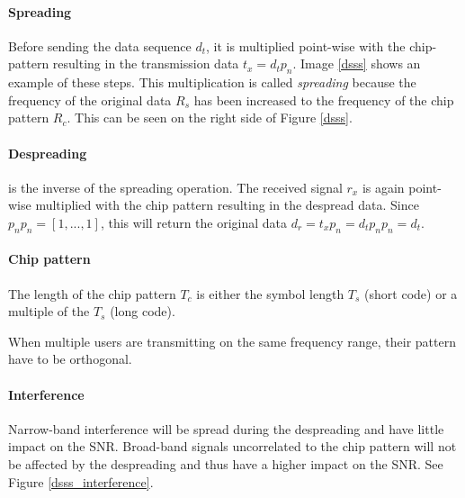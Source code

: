 		\paragraph{Spreading} Before sending the data sequence $d_t$, it is multiplied point-wise with the chip-pattern resulting in the transmission data $t_x = d_t p_n$.
		Image \ref{dsss} shows an example of these steps.
		This multiplication is called \emph{spreading} because the frequency of the original data $R_s$ has been increased to the frequency of the chip pattern $R_c$. This can be seen on the right side of Figure \ref{dsss}.
		
		\paragraph{Despreading} is the inverse of the spreading operation. The received signal $r_x$ is again point-wise multiplied with the chip pattern resulting in the despread data. Since $p_n p_n = [1,...,1]$, this will return the original data $d_r = t_x p_n = d_t p_n p_n = d_t$.
		
		\paragraph{Chip pattern} The length of the chip pattern $T_c$ is either the symbol length $T_s$ (short code) or a multiple of the $T_s$ (long code).
		
		When multiple users are transmitting on the same frequency range, their pattern have to be orthogonal.
		
		\paragraph{Interference} Narrow-band interference will be spread during the despreading and have little impact on the SNR. Broad-band signals uncorrelated to the chip pattern will not be affected by the despreading and thus have a higher impact on the SNR.
		See Figure \ref{dsss_interference}.
		
